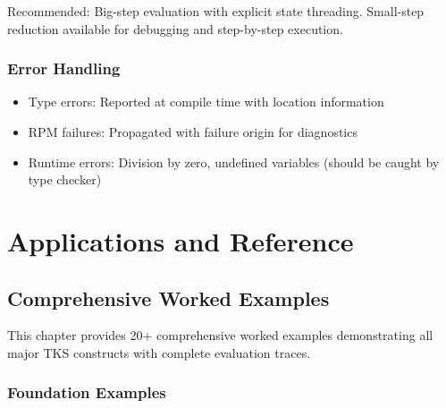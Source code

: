 \documentclass[11pt,twoside,openright]{book}
\theoremstyle{definition}
\theoremstyle{plain}
\theoremstyle{remark}
\newcommand{\vexp}{\textcolor{green!50!black}{\textbf{[EXPANDED v7.0]}}}
\begin{document}
Recommended: Big-step evaluation with explicit state threading. Small-step reduction available for debugging and step-by-step execution.

\section{Error Handling}

\begin{itemize}
\item Type errors: Reported at compile time with location information
\item RPM failures: Propagated with failure origin for diagnostics
\item Runtime errors: Division by zero, undefined variables (should be caught by type checker)
\end{itemize}

\part{Applications and Reference}

\chapter{Comprehensive Worked Examples}
\label{ch:examples}

\begin{tcolorbox}[colback=green!5!white,colframe=green!75!black,title=\vexp]
This chapter provides 20+ comprehensive worked examples demonstrating all major TKS constructs with complete evaluation traces.
\end{tcolorbox}

\section{Foundation Examples}
\end{document}
